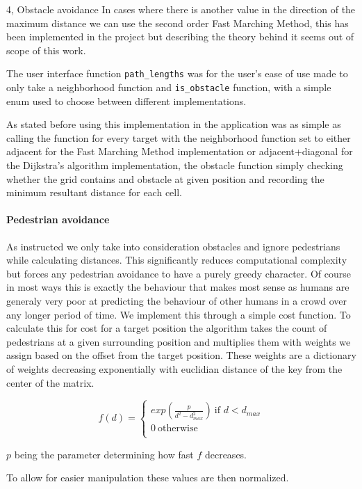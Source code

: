 \begin{task}{4, Obstacle avoidance}
In cases where there is another value in the direction of the maximum distance we can use the second order Fast Marching Method, this has been implemented in the project but describing the theory behind it seems out of scope of this work.

The user interface function \verb+path_lengths+ was for the user's ease of use made to only take a neighborhood function and \verb+is_obstacle+ function, with a simple enum used to choose between different implementations.

As stated before using this implementation in the application was as simple as calling the function for every target with the neighborhood function set to either adjacent for the Fast Marching Method implementation or adjacent+diagonal for the Dijkstra's algorithm implementation, the obstacle function simply checking whether the grid contains and obstacle at given position and recording the minimum resultant distance for each cell.

\paragraph{Pedestrian avoidance}
As instructed we only take into consideration obstacles and ignore pedestrians while calculating distances. This significantly reduces computational complexity but forces any pedestrian avoidance to have a purely greedy character. Of course in most ways this is exactly the behaviour that makes most sense as humans are generaly very poor at predicting the behaviour of other humans in a crowd over any longer period of time. We implement this through a simple cost function. To calculate this for cost for a target position the algorithm takes the count of pedestrians at a given surrounding position and multiplies them with weights we assign based on the offset from the target position. These weights are a dictionary of weights decreasing exponentially with euclidian distance of the key from the center of the matrix.

$$
f(d) =
     \begin{cases}
       exp(\frac{p}{d^2-d_{max}^2}) \ \text{if $d < d_{max}$}\\
       0 \ \text{otherwise}\\
     \end{cases}
$$

$p$ being the parameter determining how fast $f$ decreases.

To allow for easier manipulation these values are then normalized.


\end{task}
